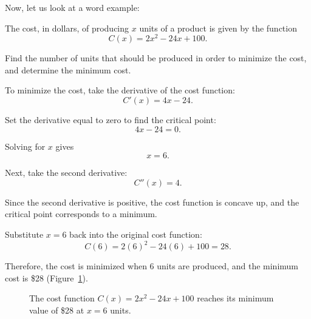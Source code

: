 Now, let us look at a word example:

\begin{Worked}
\begin{Problem}
The cost, in dollars, of producing $x$ units of a product is given by the
function
\[
C(x) = 2x^2 - 24x + 100.
\]

Find the number of units that should be produced in order to minimize
the cost, and determine the minimum cost.
\end{Problem}
\begin{Solution}
To minimize the cost, take the derivative of the cost function:
\[
C'(x) = 4x - 24.
\]

Set the derivative equal to zero to find the critical point:
\[
4x - 24 = 0.
\]

Solving for $x$ gives
\[
x = 6.
\]

Next, take the second derivative:
\[
C''(x) = 4.
\]

Since the second derivative is positive, the cost function is concave
up, and the critical point corresponds to a minimum.

Substitute $x = 6$ back into the original cost function:
\[
C(6) = 2(6)^2 - 24(6) + 100 = 28.
\]

Therefore, the cost is minimized when 6 units are produced, and the
minimum cost is \$28 (Figure~\ref{fig:cost-minimum}).
\end{Solution}
\end{Worked}

\begin{figure}[H]
\centering
{}
\caption{The cost function $C(x) = 2x^2 - 24x + 100$ reaches its minimum value of \$28 at $x = 6$ units.}
\label{fig:cost-minimum}
\end{figure}

